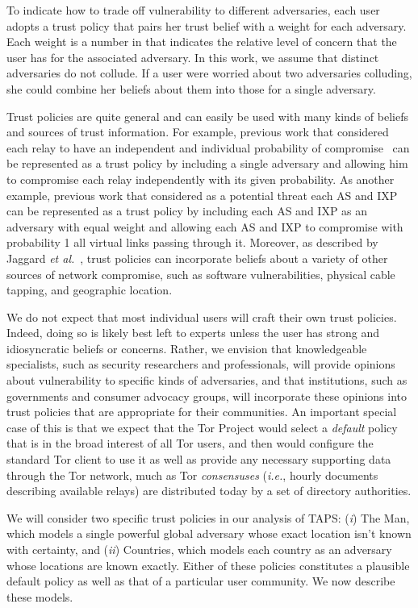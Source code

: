\documentclass[conference]{styles/IEEEtran}
\newcommand{\etal}{\emph{et al.}}
\newcommand{\ie}{\emph{i.e.}}
\newcommand{\ps}{TAPS\xspace}
\begin{document}
To indicate how to trade off vulnerability to different adversaries, each user adopts a trust
policy that pairs her trust belief with a weight for each adversary. Each weight is a number in
 that indicates the relative level of concern that the user has for the associated
adversary. In this work, we assume that distinct adversaries do not collude.  If a user were worried
about two  adversaries colluding, she could combine her beliefs about them into those for a single
adversary. 

Trust policies are quite general and can easily be used with many kinds of beliefs
and sources of trust information. For example, previous work that considered each relay to have
an independent and individual probability of compromise~\cite{jsdm11ccs,trusted-set} can be
represented as a trust policy by including a single adversary and allowing him to compromise
each relay independently with its given probability. As
another example, previous work that considered as a potential threat each AS and
IXP~\cite{feamster:wpes2004,tor-as,juen-masters,murdoch:pet2007} can be represented as a trust
policy by including each AS and IXP as an adversary with equal weight and allowing each AS and IXP
to compromise with probability 1 all virtual links passing through it. Moreover, as described
by Jaggard \etal~\cite{trustrep-popets14}, trust policies can incorporate beliefs about a variety
of other sources of network compromise, such as software vulnerabilities, physical cable tapping,
and geographic location.

We do not expect that most individual users will craft their own trust policies. Indeed, doing so
is likely best left to experts unless the user has strong and idiosyncratic beliefs or concerns.
Rather, we envision that knowledgeable specialists, such as security researchers and professionals,
will provide
opinions about vulnerability to specific kinds of adversaries, and that institutions, such as
governments and consumer advocacy groups, will incorporate these opinions into trust policies that
are appropriate for their communities. An important special case of this is that we expect that the
Tor Project would select a \emph{default} policy that is in the broad interest of all Tor users, and
then would configure the standard Tor client to use it as well as provide any necessary supporting
data through the Tor network, much as Tor \emph{consensuses} (\ie{}, hourly documents describing
available relays) are distributed today by a set of directory authorities.

We will consider two specific trust policies in our analysis of \ps: (\emph{i}) \textsf{The Man},
which models a single powerful global adversary whose exact location isn't known with certainty,
and (\emph{ii}) \textsf{Countries}, which models each country as an adversary whose
locations are known exactly. Either of these policies constitutes a plausible default policy as well
as that of a particular user community. We now describe these models.
\end{document}
